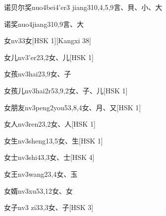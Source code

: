 \begin{entry}{诺贝尔奖}{nuo4bei4'er3 jiang3}{10,4,5,9}{⾔、⾙、⼩、⼤}
\end{entry}

\begin{entry}{诺奖}{nuo4jiang3}{10,9}{⾔、⼤}
\end{entry}

\begin{entry}{女}{nv3}{3}{⼥}[HSK 1][Kangxi 38]
\end{entry}

\begin{entry}{女儿}{nv3'er2}{3,2}{⼥、⼉}[HSK 1]
\end{entry}

\begin{entry}{女孩}{nv3hai2}{3,9}{⼥、⼦}
\end{entry}

\begin{entry}{女孩儿}{nv3hai2r5}{3,9,2}{⼥、⼦、⼉}[HSK 1]
\end{entry}

\begin{entry}{女朋友}{nv3peng2you5}{3,8,4}{⼥、⽉、⼜}[HSK 1]
\end{entry}

\begin{entry}{女人}{nv3ren2}{3,2}{⼥、⼈}[HSK 1]
\end{entry}

\begin{entry}{女生}{nv3sheng1}{3,5}{⼥、⽣}[HSK 1]
\end{entry}

\begin{entry}{女士}{nv3shi4}{3,3}{⼥、⼠}[HSK 4]
\end{entry}

\begin{entry}{女王}{nv3wang2}{3,4}{⼥、⽟}
\end{entry}

\begin{entry}{女婿}{nv3xu5}{3,12}{⼥、⼥}
\end{entry}

\begin{entry}{女子}{nv3 zi3}{3,3}{⼥、⼦}[HSK 3]
\end{entry}


